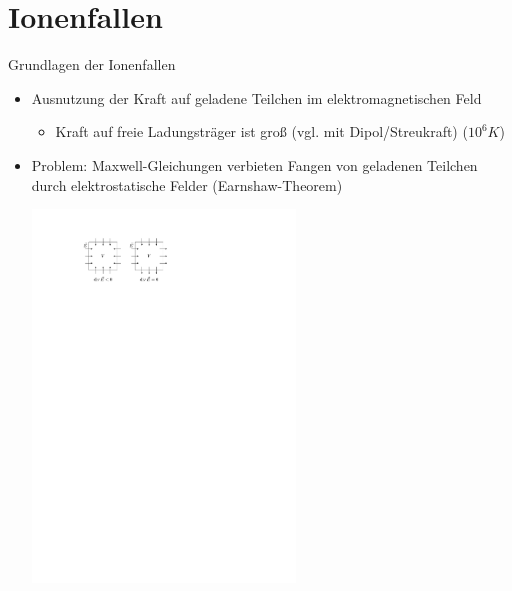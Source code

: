\documentclass[12pt,xcolor=dvipsnames]{beamer}
\begin{document}
\section{Ionenfallen}

\begin{frame}{Grundlagen der Ionenfallen}
	\begin{itemize}
		\item Ausnutzung der Kraft auf geladene Teilchen im elektromagnetischen Feld
			\begin{itemize}
				\item Kraft auf freie Ladungsträger ist groß (vgl. mit Dipol/Streukraft) ($10^6 \si{K}$)
			\end{itemize}
		
		\item \alert{Problem:} Maxwell-Gleichungen verbieten Fangen von geladenen Teilchen durch elektrostatische Felder (Earnshaw-Theorem)
		
		\vspace{0.5cm}
		\centering
		\includegraphics[width=0.55\textwidth]{./figures/earnshaw.pdf}
		
	\end{itemize}
\end{frame}
\end{document}
